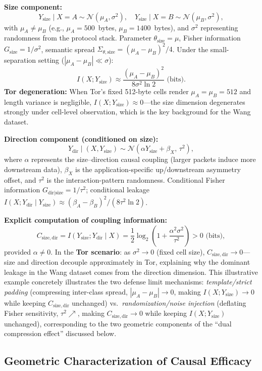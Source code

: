 \documentclass[lettersize,journal]{IEEEtran}
\begin{document}
\textbf{Size component:}
\[
Y_{\mathrm{size}}\mid X=A \sim \mathcal{N}(\mu_A,\sigma^2), \quad
Y_{\mathrm{size}}\mid X=B \sim \mathcal{N}(\mu_B,\sigma^2),
\]
with $\mu_A \neq \mu_B$ (e.g., $\mu_A=500$~bytes, $\mu_B=1400$~bytes),
and $\sigma^2$ representing randomness from the protocol stack.
Parameter $\theta_{\mathrm{size}}=\mu$, Fisher information $G_{\mathrm{size}}=1/\sigma^2$,
semantic spread $\Sigma_{\theta,\mathrm{size}} = (\mu_A-\mu_B)^2/4$.
Under the small-separation setting ($|\mu_A-\mu_B|\ll\sigma$):
\[
I(X;Y_{\mathrm{size}})\approx \frac{(\mu_A-\mu_B)^2}{8\sigma^2\ln 2} \text{ (bits)}.
\]
\textbf{Tor degeneration:} When Tor's fixed 512-byte cells render
$\mu_A=\mu_B=512$ and length variance is negligible,
$I(X;Y_{\mathrm{size}})\approx 0$---the size dimension degenerates strongly
under cell-level observation, which is the key background for the Wang
dataset.

\textbf{Direction component (conditioned on size):}
\[
Y_{\mathrm{dir}}\mid (X,Y_{\mathrm{size}}) \sim \mathcal{N}(\alpha Y_{\mathrm{size}} + \beta_X,\, \tau^2),
\]
where $\alpha$ represents the size--direction causal coupling (larger
packets induce more downstream data), $\beta_X$ is the application-specific
up/downstream asymmetry offset, and $\tau^2$ is the interaction-pattern
randomness.
Conditional Fisher information $G_{\mathrm{dir}|\mathrm{size}}=1/\tau^2$;
conditional leakage $I(X;Y_{\mathrm{dir}}\mid Y_{\mathrm{size}})\approx
(\beta_A-\beta_B)^2/(8\tau^2\ln 2)$.

\textbf{Explicit computation of coupling information:}
\[
C_{\mathrm{size,dir}} = I(Y_{\mathrm{size}};Y_{\mathrm{dir}}\mid X)
  = \frac{1}{2}\log_2\!\left(1+\frac{\alpha^2\sigma^2}{\tau^2}\right) > 0 \text{ (bits)},
\]
provided $\alpha\neq 0$.
In the \textbf{Tor scenario}: as $\sigma^2\to 0$ (fixed cell size),
$C_{\mathrm{size,dir}}\to 0$---size and direction decouple approximately in Tor,
explaining why the dominant leakage in the Wang dataset comes from the
direction dimension.
This illustrative example concretely illustrates the two defense limit mechanisms:
\emph{template/strict padding} (compressing inter-class spread,
$|\mu_A-\mu_B|\to 0$, making $I(X;Y_{\mathrm{size}})\to 0$ while keeping
$C_{\mathrm{size,dir}}$ unchanged) vs.\ \emph{randomization/noise injection}
(deflating Fisher sensitivity, $\tau^2\nearrow$, making
$C_{\mathrm{size,dir}}\to 0$ while keeping $I(X;Y_{\mathrm{size}})$
unchanged), corresponding to the two geometric components of the
``dual compression effect'' discussed below.

\subsection{Geometric Characterization of Causal Efficacy}
\end{document}
